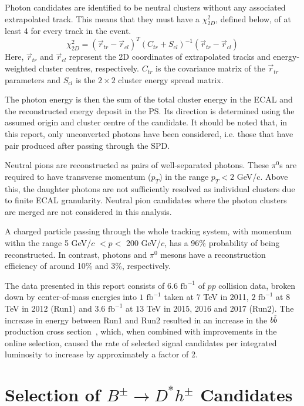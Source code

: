 \documentclass[oneside,12pt]{article}
\newcommand{\overbar}[1]{\mkern 1.5mu\overline{\mkern-1.5mu#1\mkern-1.5mu}\mkern
1.5mu}
\begin{document}
Photon candidates are identified to be neutral clusters without any associated
extrapolated track. This means that they must have a $\chi^2_{2D}$, defined
below, of at least 4 for every track in the event.
\begin{equation}
  \chi^2_{2D}=(\vec{r}_{tr}-\vec{r}_{cl})^T(C_{tr}+S_{cl})^{-1}(\vec{r}_{tr}-\vec{r}_{cl})
  \label{Chi2}
\end{equation}
\noindent Here, $\vec{r}_{tr}$ and $\vec{r}_{cl}$ represent the 2D coordinates
of extrapolated tracks and energy-weighted cluster centres, respectively.
$C_{tr}$ is the covariance matrix of the $\vec{r}_{tr}$ parameters and $S_{cl}$
is the $2 \times 2$ cluster energy spread matrix.  

The photon energy is then the sum of the total cluster energy in the ECAL and
the reconstructed energy deposit in the PS. Its direction is determined using
the assumed origin and cluster centre of the candidate. It should be noted that,
in this report, only unconverted photons have been considered, i.e. those that
have pair produced after passing through the SPD.

Neutral pions are reconstructed as pairs of well-separated photons. These
$\pi^0$s are required to have transverse momentum ($p_T$) in the range $p_{T}<2$
GeV/c.  Above this, the daughter photons are not sufficiently resolved as
individual clusters due to finite ECAL granularity. Neutral pion candidates
where the photon clusters are merged are not considered in this analysis.

A charged particle passing through the whole tracking system, with momentum
withn the range 5 GeV/$c$ $< p <$ 200 GeV/$c$, has a 96\% probability of being
reconstructed. In contrast, photons and $\pi^0$ mesons have a reconstruction
efficiency of around 10\% and 3\%, respectively.

The data presented in this report consists of $6.6$ $\text{fb}^{-1}$ of $pp$
collision data, broken down by center-of-mass energies into $1$ $\text{fb}^{-1}$ taken at $7$ TeV in 2011, $2$
$\text{fb}^{-1}$ at $8$ TeV in 2012 (Run1) and $3.6$ $\text{fb}^{-1}$ at $13$
TeV in 2015, 2016 and 2017 (Run2). The increase in energy between Run1 and Run2
resulted in an increase in the $b\overbar{b}$ production cross
section~\cite{PDG2018}, which, when combined with improvements in the online
selection, caused the rate of selected signal candidates per integrated
luminosity to increase by approximately a factor of 2.

\section{Selection of $B^{\pm}\rightarrow D^*h^{\pm}$ Candidates} \label{selections}
\end{document}
